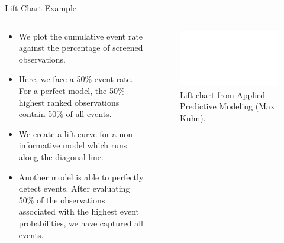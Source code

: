 \documentclass[11pt,compress,t,notes=noshow, xcolor=table]{beamer}
\begin{document}
\begin{frame}{Lift Chart Example}
\begin{columns}
\begin{column}{0.5\textwidth}
\begin{itemize}
    \item We plot the cumulative event rate against the percentage of screened observations.
    \item Here, we face a 50\% event rate. For a perfect model, the 50\% highest ranked observations contain 50\% of all events.
    \item We create a lift curve for a non-informative model which runs along the diagonal line.
    \item Another model is able to perfectly detect events. After evaluating 50\% of the observations associated with the highest event probabilities, we have captured all events.
\end{itemize}
\end{column}
\begin{column}{0.5\textwidth}
\begin{figure}
    \centering
    \includegraphics[width = \textwidth]{figure/empty.png}

    \caption{Lift chart from Applied Predictive Modeling (Max Kuhn).}
\end{figure}
\end{column}

\end{columns}

\end{frame}


\end{document}
